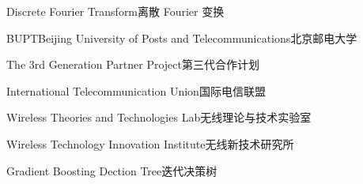 

{Discrete Fourier Transform}{离散 Fourier 变换}

{BUPT}{Beijing University of Posts and Telecommunications}{北京邮电大学}

{The 3rd Generation Partner Project}{第三代合作计划}

{International Telecommunication Union}{国际电信联盟}

{Wireless Theories and Technologies Lab}{无线理论与技术实验室}

{Wireless Technology Innovation Institute}{无线新技术研究所}

{Gradient Boosting Dection Tree}{迭代决策树}
